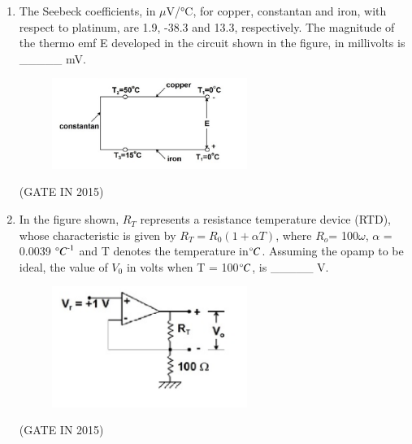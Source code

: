 \documentclass[journal]{IEEEtran}
\begin{document}
\begin{enumerate}
\item The Seebeck coefficients, in $\mu$V/°C, for copper, constantan and iron, with respect to platinum, are 1.9, -38.3 and 13.3, respectively. The magnitude of the thermo emf E developed in the circuit shown in the figure, in millivolts is \_\_\_\_\_ mV.
\begin{figure}[H]
    \centering
      \includegraphics[width=0.6\textwidth]{18.png} 
      \caption{}
    \label{fig:fig18} 
\end{figure}
 \hfill(GATE IN 2015)

\item In the figure shown, $R_T$ represents a resistance temperature device (RTD), whose characteristic is given by $R_T = R_0(1 + \alpha T)$, where $R_o$= 100$\omega$, $\alpha$ = 0.0039 ${\degree C}^\text{-1}$ and T denotes the temperature in$\degree C$. Assuming the opamp to be ideal, the value of $V_0$ in volts when T = 100$\degree C$, is \_\_\_\_\_ V.
\begin{figure}[H]
    \centering
      \includegraphics[width=0.6\textwidth]{19.png} 
      \caption{}
    \label{fig:fig19} 
\end{figure}
 \hfill(GATE IN 2015)


\end{enumerate}
\end{document}
